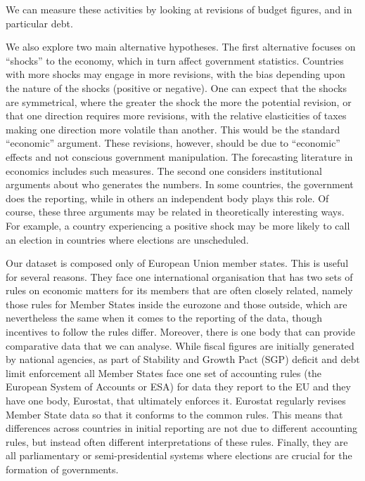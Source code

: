\documentclass[]{article}
\begin{document}
We can measure these activities by looking at revisions of budget figures, and in particular debt.

We also explore two main alternative hypotheses. The first alternative focuses on ``shocks'' to the economy, which in turn affect government statistics. Countries with more shocks may engage in more revisions, with the bias depending upon the nature of the shocks (positive or negative). One can expect that the shocks are symmetrical, where the greater the shock the more the potential revision, or that one direction requires more revisions, with  the relative elasticities of taxes making one direction more volatile than another. This would be the standard ``economic'' argument. These revisions, however, should be due to ``economic'' effects and not conscious government manipulation. The forecasting literature in economics includes such measures. The second one considers institutional arguments about who generates the numbers. In some countries, the government does the reporting, while in others an independent body plays this role. Of course, these three arguments may be related in theoretically interesting ways. For example, a country experiencing a positive shock may be more likely to call an election in countries where elections are unscheduled.

Our dataset is composed only of European Union member states. This is useful for several reasons. They face one international organisation that has two sets of rules on economic matters for its members that are often closely related, namely those rules for Member States inside the eurozone and those outside, which are nevertheless the same when it comes to the reporting of the data, though incentives to follow the rules differ. Moreover, there is one body that can provide comparative data that we can analyse. While fiscal figures are initially generated by national agencies, as part of Stability and Growth Pact (SGP) deficit and debt limit enforcement all Member States face one set of accounting rules (the European System of Accounts or ESA) for data they report to the EU and they have one body, Eurostat, that ultimately enforces it. Eurostat regularly revises Member State data so that it conforms to the common rules. This means that differences across countries in initial reporting are not due to different accounting rules, but instead often different interpretations of these rules. Finally, they are all parliamentary or semi-presidential systems where elections are crucial for the formation of governments.
\end{document}
